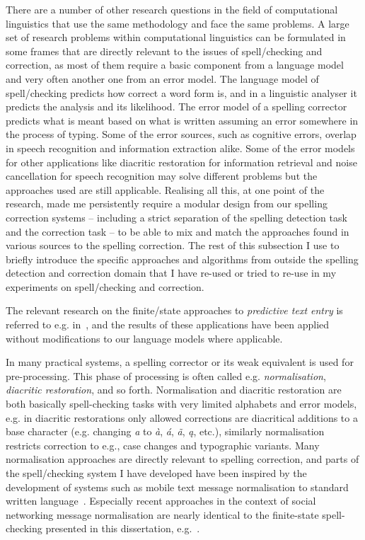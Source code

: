 \documentclass[officiallayout,final]{unihelcompling}
\begin{document}
There are a number of other research questions in the field of computational
linguistics that use the same methodology and face the same problems. A large
set of research problems within computational linguistics can be formulated in
some frames that are directly relevant to the issues of spell\-/checking and
correction, as most of them require a basic component from a language model and
very often another one from an error model. The language model of
spell\-/checking predicts how correct a word form is, and in a linguistic
analyser it predicts the analysis and its likelihood. The error model of a
spelling corrector predicts what is meant based on what is written assuming an
error somewhere in the process of typing. Some of the error sources, such as
cognitive errors, overlap in speech recognition and information extraction
alike. Some of the error models for other applications like diacritic
restoration for information retrieval and noise cancellation for speech
recognition may solve different problems but the approaches used are still
applicable. Realising all this, at one point of the research, made me
persistently require a modular design from our spelling correction
systems -- including a strict separation of the spelling detection task and the
correction task -- to be able to mix and match the approaches found in various
sources to the spelling correction. The rest of this subsection I use to
briefly introduce the specific approaches and algorithms from outside the
spelling detection and correction domain that I have re-used or tried to
re-use in my experiments on spell\-/checking and correction.

The relevant research on the finite\-/state approaches to \emph{predictive text
entry} is referred to e.g. in~\citet{silfverberg2010partofspeech}, and the
results of these applications have been applied without modifications to our
language models where applicable.

In many practical systems, a spelling corrector or its weak equivalent is used
for pre-processing. This phase of processing is often called e.g.
\emph{normalisation}, \emph{diacritic restoration}, and so forth. Normalisation
and diacritic restoration are both basically spell-checking tasks with very
limited alphabets and error models, e.g. in diacritic restorations only allowed
corrections are diacritical additions to a base character (e.g. changing
\emph{a} to \emph{à}, \emph{á}, \emph{ã}, \emph{ą}, etc.), similarly
normalisation restricts correction to e.g., case changes and typographic
variants.  Many normalisation approaches are directly relevant to spelling
correction, and parts of the spell\-/checking system I have developed have been
inspired by the development of systems such as mobile text message
normalisation to standard written language~\citep{kobus2008normalizing}.
Especially recent approaches in the context of social networking message
normalisation are nearly identical to the finite-state spell-checking presented
in this dissertation, e.g.~\citet{hulden2013weighted}.
\end{document}
